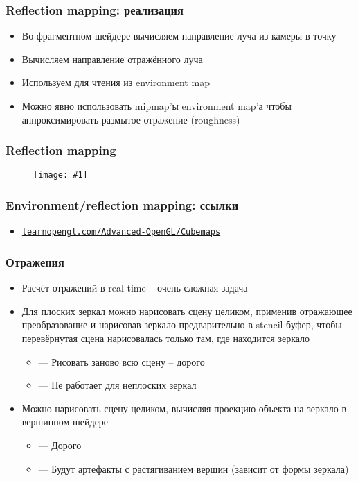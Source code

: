 \documentclass{beamer}
\newcommand{\slideimage}[1]{
  \begin{figure}
    \begin{adjustbox}{width=\textwidth, totalheight=\textheight-2\baselineskip-2\baselineskip,keepaspectratio}
      \texttt{[image: \#1]}
    \end{adjustbox}
  \end{figure}
}
\begin{document}
\begin{frame}[fragile]
\frametitle{Reflection mapping: реализация}
\begin{itemize}
\item Во фрагментном шейдере вычисляем направление луча из камеры в точку
\pause
\item Вычисляем направление отражённого луча
\pause
\item Используем для чтения из environment map
\pause
\item Можно явно использовать mipmap'ы environment map'а чтобы аппроксимировать размытое отражение (roughness)
\end{itemize}
\end{frame}

\begin{frame}[fragile]
\frametitle{Reflection mapping}
\slideimage{reflection.png}
\end{frame}

\begin{frame}[fragile]
\frametitle{Environment/reflection mapping: ссылки}
\begin{itemize}
\item \href{https://learnopengl.com/Advanced-OpenGL/Cubemaps}{\nolinkurl{learnopengl.com/Advanced-OpenGL/Cubemaps}}
\end{itemize}
\end{frame}

\begin{frame}[fragile]
\frametitle{Отражения}
\begin{itemize}
\item Расчёт отражений в real-time -- очень сложная задача
\pause
\item Для плоских зеркал можно нарисовать сцену целиком, применив отражающее преобразование и нарисовав зеркало предварительно в stencil буфер, чтобы перевёрнутая сцена нарисовалась только там, где находится зеркало
\pause
\begin{itemize}
\item {\color{red}—} Рисовать заново всю сцену -- дорого
\item {\color{red}—} Не работает для неплоских зеркал
\end{itemize}
\pause
\item Можно нарисовать сцену целиком, вычисляя проекцию объекта на зеркало в вершинном шейдере
\begin{itemize}
\item {\color{red}—} Дорого
\item {\color{red}—} Будут артефакты с растягиванием вершин (зависит от формы зеркала)
\end{itemize}
\end{itemize}
\end{frame}
\end{document}
